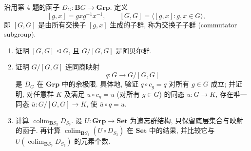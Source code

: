 \documentclass{article}
\begin{document}
\begin{problem}
沿用第 4 题的函子 $D_G:\mathbf BG\to\mathbf{Grp}$. 定义
\[
  [g,x]=gxg^{-1}x^{-1},\qquad [G,G]=\langle[g,x]:g,x\in G\rangle,
\]
即 $[G,G]$ 是由所有交换子 $[g,x]$ 生成的子群, 称为交换子子群 (commutator subgroup).
\begin{enumerate}
  \item[(a)] 证明 $[G,G]\unlhd G$, 且 $G/[G,G]$ 是阿贝尔群.
  \item[(b)] 证明 $G/[G,G]$ 连同商映射
  \[
    q:G\longrightarrow G/[G,G]
  \]
  是 $D_G$ 在 $\mathbf{Grp}$ 中的余极限. 具体地, 验证 $q\circ c_g=q$ 对所有 $g\in G$ 成立; 并证明, 对任意群 $K$ 及满足 $u\circ c_g=u$ (对所有 $g\in G$) 的同态 $u:G\to K$, 存在唯一同态 $\overline u:G/[G,G]\to K$, 使 $\overline u\circ q=u$.
  \item[(c)] 计算 $\operatorname{colim}_{\mathbf BS_3}D_{S_3}$. 设 $U:\mathbf{Grp}\to\mathbf{Set}$ 为遗忘群结构, 只保留底层集合与映射的函子. 再计算 $\operatorname{colim}_{\mathbf BS_3}(U\circ D_{S_3})$ 在 $\mathbf{Set}$ 中的结果, 并比较它与 $U(\operatorname{colim}_{\mathbf BS_3}D_{S_3})$ 的元素个数.
\end{enumerate}
\end{problem}
\end{document}
